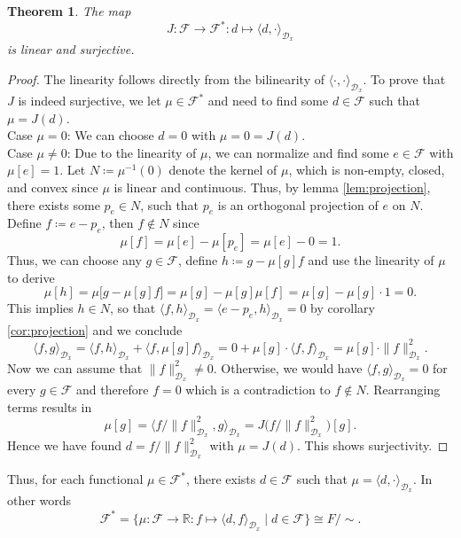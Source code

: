 \documentclass[11pt, a4paper]{article}
\newtheorem{theorem}{Theorem}[section]
\newcommand{\R}{\mathbb{R}}
\newcommand{\D}{\mathcal{D}}
\newcommand{\F}{\mathcal{F}}
\begin{document}
\begin{theorem} \label{thm:riesz}
The map
\[ J: \F \to \F^* : d \mapsto \langle d, \cdot \rangle_{\D_x} \]
is linear and surjective.
\end{theorem}

\begin{proof}
The linearity follows directly from the bilinearity of $\langle \cdot, \cdot \rangle_{\D_x}$. To prove that $J$ is indeed surjective, we let $\mu \in \F^*$ and need to find some $d \in \F$ such that $\mu = J(d)$. \\

Case $\mu=0$: We can choose $d=0$ with $\mu = 0 = J(d)$. \\

Case $\mu \neq 0$: Due to the linearity of $\mu$, we can normalize and find some $e \in \F$ with $\mu[e] = 1$. Let $N \coloneq \mu^{-1}(0)$ denote the kernel of $\mu$, which is non-empty, closed, and convex since $\mu$ is linear and continuous. Thus, by lemma \ref{lem:projection}, there exists some $p_e \in N$, such that $p_e$ is an orthogonal projection of $e$ on $N$. Define $f \coloneq e - p_e$, then $f \notin N$ since
\[ \mu[f] = \mu[e] - \mu[p_e] = \mu[e] - 0 = 1. \]
Thus, we can choose any $g \in \F$, define $h \coloneq g - \mu[g]f$ and use the linearity of $\mu$ to derive
\[ \mu[h] = \mu \big [g- \mu[g]f \big] = \mu[g] - \mu[g] \mu[f] = \mu[g] - \mu[g] \cdot 1 = 0. \]
This implies $h \in N$, so that $\langle f , h \rangle_{\D_x} = \langle e - p_e, h \rangle_{\D_x} = 0$ by corollary \ref{cor:projection} and we conclude
\[ \langle f, g \rangle_{\D_x} = \langle f , h \rangle_{\D_x} + \langle f , \mu[g]f \rangle_{\D_x} = 0 + \mu[g] \cdot \langle f , f \rangle_{\D_x} = \mu[g] \cdot \| f \|_{\D_x}^2. \]
Now we can assume that $\| f \|_{\D_x}^2 \neq 0$. Otherwise, we would have $\langle f, g \rangle_{\D_x} = 0$ for every $g \in \F$ and therefore $f = 0$ which is a contradiction to $f \notin N$. Rearranging terms results in
\[ \mu[g] = \big \langle f / \| f \|_{\D_x}^2 , g \big \rangle_{\D_x} = J \big (f / \| f \|_{\D_x}^2 \big)[g]. \]
Hence we have found $d = f / \| f \|_{\D_x}^2$ with $\mu = J(d)$. This shows surjectivity.
\end{proof}

Thus, for each functional $\mu \in \F^*$, there exists $d \in \F$ such that $\mu = \langle d, \cdot \rangle_{\D_x}$. In other words
\[ \F^* = \Big \{ \mu : \F \to \R : f \mapsto \langle d,f \rangle _{\D_x} \mid d \in \F \Big \} \cong F/{\sim}. \]
\end{document}
